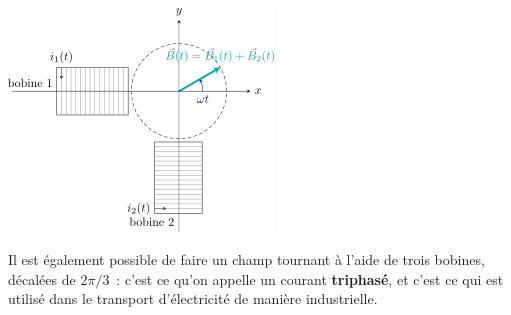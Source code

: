 \documentclass[../../main/main.tex]{subfiles}
\begin{document}
\hfill
\begin{minipage}[t]{.35\linewidth}
	~
	\begin{center}
		\includegraphics[scale=1]{btourn2}
		\label{fig:btourn2}
	\end{center}
\end{minipage}
Il est également possible de faire un champ tournant à l'aide de trois bobines,
décalées de $2\pi/3$~: c'est ce qu'on appelle un courant \textbf{triphasé}, et
c'est ce qui est utilisé dans le transport d'électricité de manière
industrielle.
\end{document}
